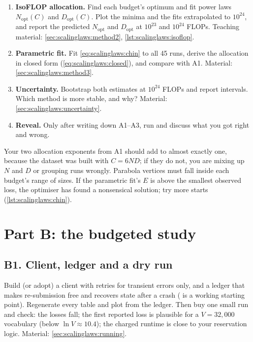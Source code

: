 \begin{enumerate}
\item[A1.] \textbf{IsoFLOP allocation.} Find each budget's optimum and fit power laws
      $N_{\text{opt}}(C)$ and $D_{\text{opt}}(C)$. Plot the minima and the fits extrapolated to
      $10^{24}$, and report the predicted $N_{\text{opt}}$ and $D_{\text{opt}}$ at $10^{23}$ and
      $10^{24}$ FLOPs. Teaching material: \cref{sec:scalinglaws:method2},
      \cref{lst:scalinglaws:isoflop}.
\item[A2.] \textbf{Parametric fit.} Fit \cref{eq:scalinglaws:chin} to all 45 runs, derive the
      allocation in closed form (\cref{eq:scalinglaws:closed}), and compare with A1.
      Material: \cref{sec:scalinglaws:method3}.
\item[A3.] \textbf{Uncertainty.} Bootstrap both estimates at $10^{24}$ FLOPs and report
      intervals. Which method is more stable, and why? Material: \cref{sec:scalinglaws:uncertainty}.
\item[A4.] \textbf{Reveal.} Only after writing down A1--A3, run  and discuss what
      you got right and wrong.
\end{enumerate}

\begin{pitfall}
Your two allocation exponents from A1 should add to almost exactly one, because the dataset
was built with $C=6ND$; if they do not, you are mixing up $N$ and $D$ or grouping runs wrongly.
Parabola vertices must fall inside each budget's range of sizes. If the parametric fit's $E$
is above the smallest observed loss, the optimiser has found a nonsensical solution; try more
starts (\cref{lst:scalinglaws:chin}).
\end{pitfall}

\section{Part B: the budgeted study}\label{sec:proj3:partB}

\subsection*{B1. Client, ledger and a dry run}
Build (or adopt) a client with retries for transient errors only, and a ledger that makes
re-submission free and recovers state after a crash ( is a working
starting point). Regenerate every table and plot from the ledger. Then buy one small run and
check: the losses fall; the first reported loss is plausible for a $V=32{,}000$ vocabulary
(below $\ln V\approx10.4$); the charged runtime is close to your reservation logic.
Material: \cref{sec:scalinglaws:running}.


